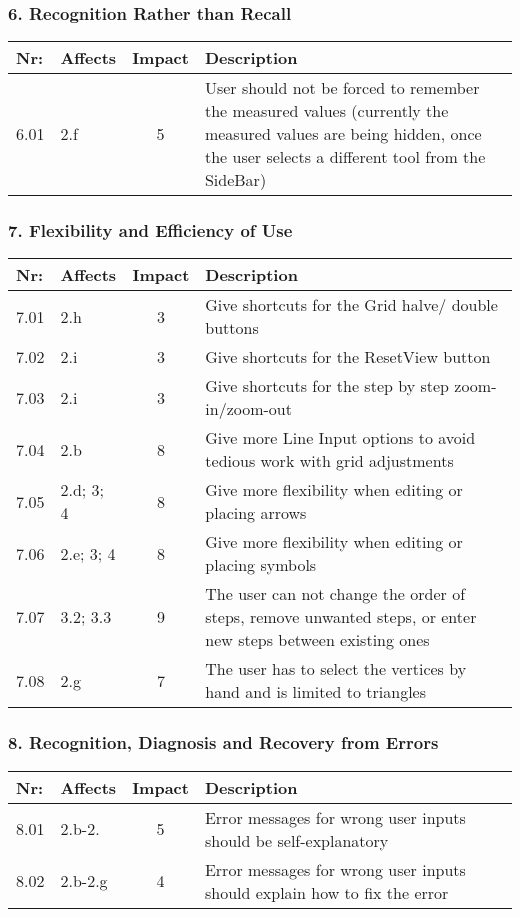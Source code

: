 \subsubsection*{6. Recognition Rather than Recall}

        \begin{tabular}{l | p{} | c | p{}}
        Nr: & Affects & Impact & Description \\ \hline
        6.01 & 2.f  & 5 & User should not be forced to remember the measured values (currently the measured values are being hidden, once the user selects a different tool from the SideBar)\\ \hline 
        \end{tabular}


\subsubsection*{7. Flexibility and Efficiency of Use}
        \begin{tabular}{l | p{} | c | p{}}
        Nr: & Affects & Impact & Description \\ \hline
        7.01 & 2.h & 3 & Give shortcuts for the Grid halve/ double buttons\\ \hline
        7.02 & 2.i  & 3 & Give shortcuts for the ResetView button\\ \hline
        7.03 & 2.i & 3 & Give shortcuts for the step by step zoom-in/zoom-out\\ \hline
        7.04 & 2.b & 8 & Give more Line Input options to avoid tedious work with grid adjustments\\ \hline
        7.05 & 2.d; 3; 4 & 8 & Give more flexibility when editing or placing arrows\\ \hline
        7.06 & 2.e; 3; 4 & 8 & Give more flexibility when editing or placing symbols\\ \hline
        7.07 & 3.2; 3.3 & 9 & The user can not change the order of steps, remove unwanted steps, or enter new steps between existing ones\\ \hline
        7.08 & 2.g & 7 & The user has to select the vertices by hand and is limited to triangles\\ \hline
        \end{tabular}

\subsubsection*{8. Recognition, Diagnosis and Recovery from Errors}
        \begin{tabular}{l | p{} | c | p{}}
        Nr: & Affects & Impact & Description \\ \hline
        8.01 & 2.b-2. & 5 & Error messages for wrong user inputs should be self-explanatory\\ \hline
        8.02 & 2.b-2.g & 4 & Error messages for wrong user inputs should explain how to fix the error\\ \hline
        \end{tabular}

